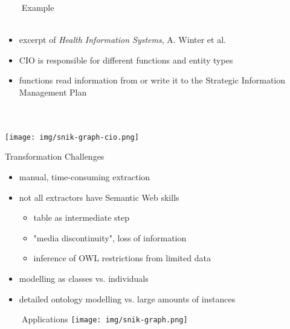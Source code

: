 \documentclass[aspectratio=1610,12pt]{beamer}
\begin{document}


\begin{frame}[plain]{~~~~Example}
~\\~\\
\begin{itemize}
\item excerpt of \emph{Health Information Systems}, A. Winter et al.
\item CIO is responsible for different functions and entity types
\item functions read information from or write it to the Strategic Information Management Plan
\end{itemize}
~\\~\\
\centering\texttt{[image: img/snik-graph-cio.png]}
\end{frame}
\restoregeometry


\begin{frame}{Transformation Challenges}
\begin{itemize}
\item manual, time-consuming extraction
\item not all extractors have Semantic Web skills 
\begin{itemize}
\item table as intermediate step
\item "media discontinuity", loss of information
\item inference of OWL restrictions from limited data 
\end{itemize}
\item modelling as classes vs. individuals
\item detailed ontology modelling vs. large amounts of instances 
\end{itemize}
\end{frame}

\begin{frame}[plain]{~~~~Applications}
\centering\texttt{[image: img/snik-graph.png]}
\end{frame}
\restoregeometry
\end{document}
